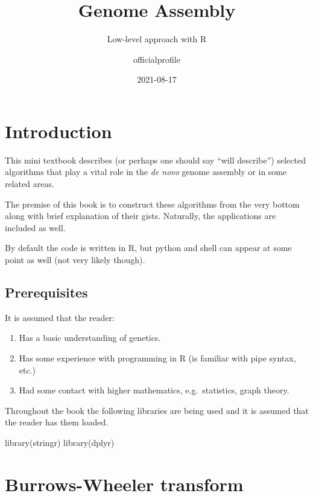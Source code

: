 \documentclass[
]{book}
\title{Genome Assembly}
\subtitle{Low-level approach with R}
\author{officialprofile}
\date{2021-08-17}
\newenvironment{Shaded}{\begin{snugshade}}{\end{snugshade}}
\newcommand{\FunctionTok}[1]{\textcolor[rgb]{0.00,0.00,0.00}{#1}}
\newcommand{\NormalTok}[1]{#1}
\begin{document}
\maketitle

{
\setcounter{tocdepth}{1}
\tableofcontents
}
\hypertarget{introduction}{%
\chapter{Introduction}\label{introduction}}

This mini textbook describes (or perhaps one should say ``will describe'') selected algorithms that play a vital role in the \emph{de novo} genome assembly or in some related areas.

The premise of this book is to construct these algorithms from the very bottom along with brief explanation of their gists. Naturally, the applications are included as well.

By default the code is written in R, but python and shell can appear at some point as well (not very likely though).

\hypertarget{prerequisites}{%
\section{Prerequisites}\label{prerequisites}}

It is assumed that the reader:

\begin{enumerate}
\def\labelenumi{\arabic{enumi}.}
\item
  Has a basic understanding of genetics.
\item
  Has some experience with programming in R (is familiar with pipe syntax, etc.)
\item
  Had some contact with higher mathematics, e.g.~statistics, graph theory.
\end{enumerate}

Throughout the book the following libraries are being used and it is assumed that the reader has them loaded.

\begin{Shaded}
\begin{Highlighting}[]
\FunctionTok{library}\NormalTok{(stringr)}
\FunctionTok{library}\NormalTok{(dplyr)}
\end{Highlighting}
\end{Shaded}

\hypertarget{bwt}{%
\chapter{Burrows-Wheeler transform}\label{bwt}}
\end{document}
